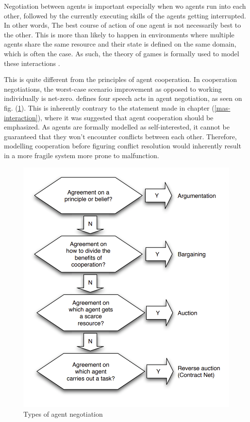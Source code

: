 \documentclass[main.tex]{subfiles}
\begin{document}
Negotiation between agents is important especially when wo agents run into each other, 
followed by the currently executing skills of the agents getting interrupted. In other words, 
The best course of action of one agent is not necessarily best to the other. This is more than
likely to happen in environments where multiple agents share the same resource and their state
is defined on the same domain, which is often the case. As such, the theory of games is formally 
used to model these interactions \cite{Binder2022}. 

This is quite different from the principles of agent cooperation. In cooperation negotiations, 
the worst-case scenario improvement as opposed to working individually is net-zero. \cite{Binder2022}
defines four speech acts in agent negotiation, as seen on fig. (\ref{fig-speech-acts}). This is 
inherently contrary to the statement made in chapter (\ref{mas-interaction}), where it was suggested 
that agent cooperation should be emphasized. As agents are formally modelled as self-interested, 
it cannot be guaranteed that they won't encounter conflicts between each other. Therefore, modelling 
cooperation before figuring conflict resolution would inherently result in a more fragile system 
more prone to malfunction. 

\begin{figure}[htbp]
    \centering
    \includegraphics[width=.8\textwidth]{speech-acts.png}
    \caption{Types of agent negotiation \cite{Binder2022}}
    \label{fig-speech-acts}
\end{figure}
\end{document}
